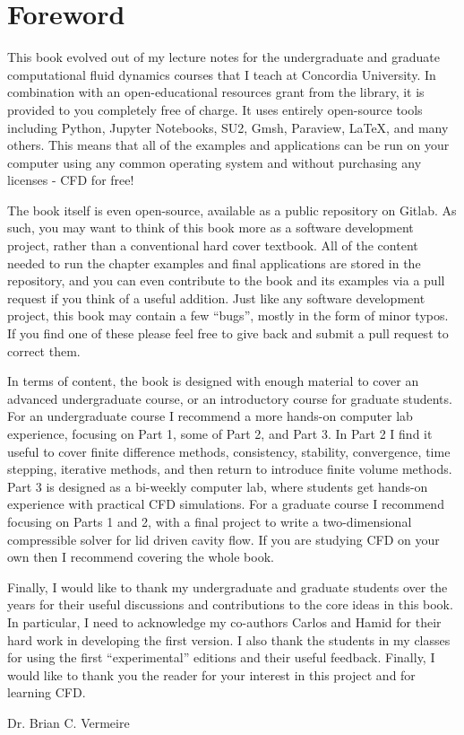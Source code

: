 \clearpage
\section*{Foreword}
This book evolved out of my lecture notes for the undergraduate and graduate computational fluid dynamics courses that I teach at Concordia University. In combination with an open-educational resources grant from the library, it is provided to you completely free of charge. It uses entirely open-source tools including Python, Jupyter Notebooks, SU2, Gmsh, Paraview, \LaTeX, and many others. This means that all of the examples and applications can be run on your computer using any common operating system and without purchasing any licenses - CFD for free! 

The book itself is even open-source, available as a public repository on Gitlab.  As such, you may want to think of this book more as a software development project, rather than a conventional hard cover textbook. All of the content needed to run the chapter examples and final applications are stored in the repository, and you can even contribute to the book and its examples via a pull request if you think of a useful addition. Just like any software development project, this book may contain a few ``bugs'', mostly in the form of minor typos. If you find one of these please feel free to give back and submit a pull request to correct them.

In terms of content, the book is designed with enough material to cover an advanced undergraduate course, or an introductory course for graduate students. For an undergraduate course I recommend a more hands-on computer lab experience, focusing on Part 1, some of Part 2, and Part 3. In Part 2 I find it useful to cover finite difference methods, consistency, stability, convergence,  time stepping, iterative methods, and then return to introduce finite volume methods. Part 3 is designed as a bi-weekly computer lab, where students get hands-on experience with practical CFD simulations. For a graduate course I recommend focusing on Parts 1 and 2, with a final project to write a two-dimensional compressible solver for lid driven cavity flow. If you are studying CFD on your own then I recommend covering the whole book.

Finally, I would like to thank my undergraduate and graduate students over the years for their useful discussions and contributions to the core ideas in this book. In particular, I need to acknowledge my co-authors Carlos and Hamid for their hard work in developing the first version. I also thank the students in my classes for using the first ``experimental'' editions and their useful feedback. Finally, I would like to thank you the reader for your interest in this project and for learning CFD.

\vspace{0.5cm}

\noindent Dr. Brian C. Vermeire